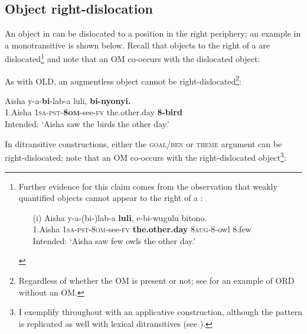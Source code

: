 \documentclass[output=paper
,newtxmath
,modfonts
,nonflat]{langsci/langscibook}
\begin{document}
\subsection{Object right-dislocation}\label{sec:ranero:3.3}

An object in  can be dislocated to a position in the right periphery; an example in a monotransitive is shown below. Recall that objects to the right of a  are dislocated\footnote{Further evidence for this claim comes from the observation that weakly quantified objects cannot appear to the right of a :
\begin{enumerate}
\item[(i)] \gll *Aisha   y-a-(bi-)lab-a             \textbf{luli},                e-bi-wugulu  bitono.\\
	1.Aisha  \textsc{1sa-pst-8om}{}-see-\textsc{fv} \textbf{the.other.day} 8\textsc{aug}{}-8-owl  8.few\\
	\glt Intended: ‘Aisha saw few owls the other day.’
\end{enumerate}
} and note that an OM co-occurs with the dislocated object: 


\z

As with OLD, an augmentless object cannot be right-dislocated\footnote{Regardless of whether the OM is present or not; see  for an example of ORD without an OM.}:

\ea       \label{ex:ranero:22}
\gll *Aisha  y-a-\textbf{bi}{}-lab-a         luli,         \textbf{bi-nyonyi.}\\
1.Aisha \textsc{1sa-pst-}\textbf{8\textsc{om}}{}-see\textsc{{}-fv}  the.other.day \textbf{8-bird}\\
\glt Intended: ‘Aisha saw the birds the other day.’ 
\z

In ditransitive constructions, either the \textsc{goal/ben} or \textsc{theme} argument can be right-dislocated; note that an OM co-occurs with the right-dislocated object\footnote{I exemplify throughout with an applicative construction, although the pattern is replicated as well with lexical ditransitives (see \citealt{ranero2015}).}:
\end{document}
